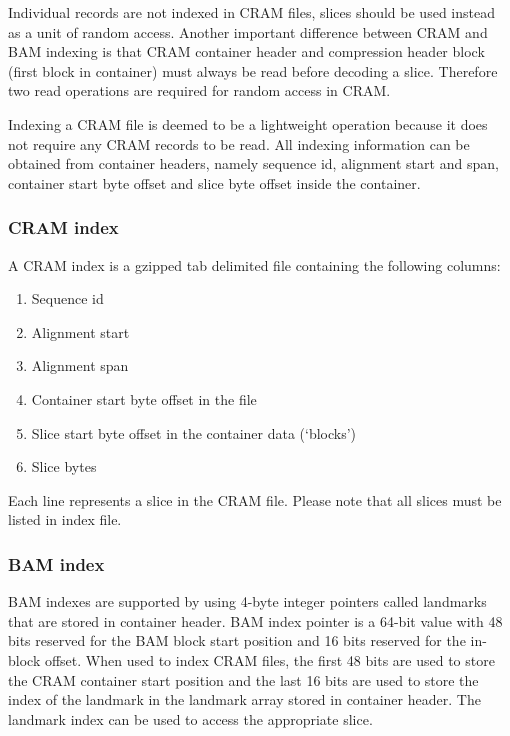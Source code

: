 \documentclass[a4paper]{article}
\begin{document}
Individual records are not indexed in CRAM files, slices should be used instead 
as a unit of random access. Another important difference between CRAM and BAM indexing 
is that CRAM container header and compression header block (first block in container) 
must always be read before decoding a slice. Therefore two read operations are 
required for random access in CRAM.

Indexing a CRAM file is deemed to be a lightweight operation because it does not 
require any CRAM records to be read. All indexing information can be obtained from 
container headers, namely sequence id, alignment start and span, container start 
byte offset and slice byte offset inside the container. 

\subsubsection*{CRAM index}

A CRAM index is a gzipped tab delimited file containing the following columns:

\begin{enumerate}
\item Sequence id

\item Alignment start

\item Alignment span

\item Container start byte offset in the file

\item Slice start byte offset in the container data (`blocks')

\item Slice bytes
\end{enumerate}

Each line represents a slice in the CRAM file. Please note that all slices must 
be listed in index file.

\subsubsection*{BAM index}

BAM indexes are supported by using 4-byte integer pointers called landmarks that 
are stored in container header. BAM index pointer is a 64-bit value with 48 bits 
reserved for the BAM block start position and 16 bits reserved for the in-block 
offset. When used to index CRAM files, the first 48 bits are used to store the 
CRAM container start position and the last 16 bits are used to store the index 
of the landmark in the landmark array stored in  container header. The landmark 
index can be used to access the appropriate slice. 
\end{document}
